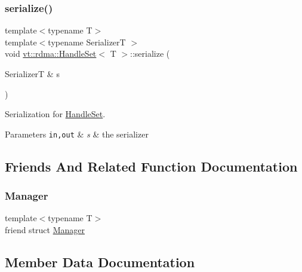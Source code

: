 \subsubsection{\texorpdfstring{serialize()}{serialize()}}
{\footnotesize\ttfamily template$<$typename T$>$ \\
template$<$typename SerializerT $>$ \\
void \hyperlink{structvt_1_1rdma_1_1_handle_set}{vt\+::rdma\+::\+Handle\+Set}$<$ T $>$\+::serialize (\begin{DoxyParamCaption}\item[{SerializerT \&}]{s }\end{DoxyParamCaption})\hspace{0.3cm}{\ttfamily [inline]}}



Serialization for {\ttfamily \hyperlink{structvt_1_1rdma_1_1_handle_set}{Handle\+Set}}. 


\begin{DoxyParams}[1]{Parameters}
\mbox{\tt in,out}  & {\em s} & the serializer \\
\hline
\end{DoxyParams}


\subsection{Friends And Related Function Documentation}
\mbox{\label{structvt_1_1rdma_1_1_handle_set_a1fd6b9bc3f72bb2b64e602de3982929d}} 
\subsubsection{\texorpdfstring{Manager}{Manager}}
{\footnotesize\ttfamily template$<$typename T$>$ \\
friend struct \hyperlink{structvt_1_1rdma_1_1_manager}{Manager}\hspace{0.3cm}{\ttfamily [friend]}}



\subsection{Member Data Documentation}
\mbox{\label{structvt_1_1rdma_1_1_handle_set_a1864dc0d064a06915f3ceb2e6e13f875}} 
